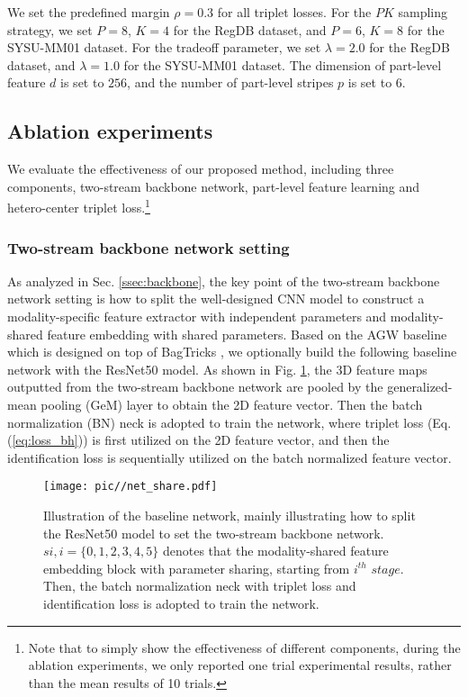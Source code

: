 \documentclass[journal]{IEEEtran}
\begin{document}
We set the predefined margin $\rho = 0.3$ for all triplet losses.
For the $PK$ sampling strategy, we set $P = 8$, $K=4$ for the RegDB dataset, and $P=6$, $K=8$ for the SYSU-MM01 dataset.
For the tradeoff parameter, we set $\lambda = 2.0$ for the RegDB dataset, and $\lambda = 1.0$ for the SYSU-MM01 dataset.
The dimension of part-level feature $d$ is set to $256$, and the number of part-level stripes $p$ is set to $6$.

\subsection{Ablation experiments}
\label{ssec:ablation}
We evaluate the effectiveness of our proposed method, including three components, two-stream backbone network, part-level feature learning and hetero-center triplet loss.\footnote{Note that to simply show the effectiveness of different components, during the ablation experiments, we only reported one trial experimental results, rather than the mean results of 10 trials.}


\subsubsection{Two-stream backbone network setting}
\label{sssec:banckbone}
As analyzed in Sec. \ref{ssec:backbone}, the key point of the two-stream backbone network setting is how to split the well-designed CNN model to construct a modality-specific feature extractor with independent parameters and modality-shared feature embedding with shared parameters.
Based on the AGW baseline \cite{Ye2020DeepLF} which is designed on top of BagTricks \cite{Luo2019ASB}, we optionally build the following baseline network with the ResNet50 model.
As shown in Fig. \ref{fig:net_share}, the 3D feature maps outputted from the two-stream backbone network are pooled by the generalized-mean pooling (GeM) layer to obtain the 2D feature vector. Then the batch normalization (BN) neck is adopted to train the network, where triplet loss (Eq. (\ref{eq:loss_bh})) is first utilized on the 2D feature vector, and then the identification loss is sequentially utilized on the batch normalized feature vector.

\begin{figure}
\centering
\texttt{[image: pic//net\_share.pdf]}
\caption{Illustration of the baseline network, mainly illustrating how to split the ResNet50 model to set the two-stream backbone network. $si, i=\{0,1,2,3,4,5\}$ denotes that the modality-shared feature embedding block with parameter sharing, starting from $i^{th}$ $stage$. Then, the batch normalization neck with triplet loss and identification loss is adopted to train the network.}
\label{fig:net_share}
\end{figure}
\end{document}
